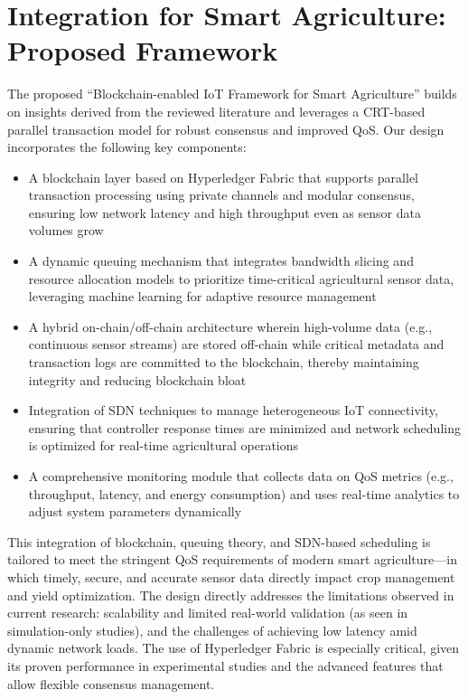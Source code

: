 \documentclass[12pt,onecolumn]{IEEEtran} %
\begin{document}
\section*{Integration for Smart Agriculture: Proposed Framework}
The proposed ``Blockchain-enabled IoT Framework for Smart Agriculture'' builds on insights derived from the reviewed literature and leverages a CRT-based parallel transaction model for robust consensus and improved QoS. Our design incorporates the following key components:
\begin{itemize}
\item A blockchain layer based on Hyperledger Fabric that supports parallel transaction processing using private channels and modular consensus, ensuring low network latency and high throughput even as sensor data volumes grow
\item A dynamic queuing mechanism that integrates bandwidth slicing and resource allocation models to prioritize time-critical agricultural sensor data, leveraging machine learning for adaptive resource management
\item A hybrid on-chain/off-chain architecture wherein high-volume data (e.g., continuous sensor streams) are stored off-chain while critical metadata and transaction logs are committed to the blockchain, thereby maintaining integrity and reducing blockchain bloat
\item Integration of SDN techniques to manage heterogeneous IoT connectivity, ensuring that controller response times are minimized and network scheduling is optimized for real-time agricultural operations
\item A comprehensive monitoring module that collects data on QoS metrics (e.g., throughput, latency, and energy consumption) and uses real-time analytics to adjust system parameters dynamically
\end{itemize}

This integration of blockchain, queuing theory, and SDN-based scheduling is tailored to meet the stringent QoS requirements of modern smart agriculture---in which timely, secure, and accurate sensor data directly impact crop management and yield optimization. The design directly addresses the limitations observed in current research: scalability and limited real-world validation (as seen in simulation-only studies), and the challenges of achieving low latency amid dynamic network loads. The use of Hyperledger Fabric is especially critical, given its proven performance in experimental studies \cite{pajooh2022experimentalperformanceanalysis} and the advanced features that allow flexible consensus management.
\end{document}
